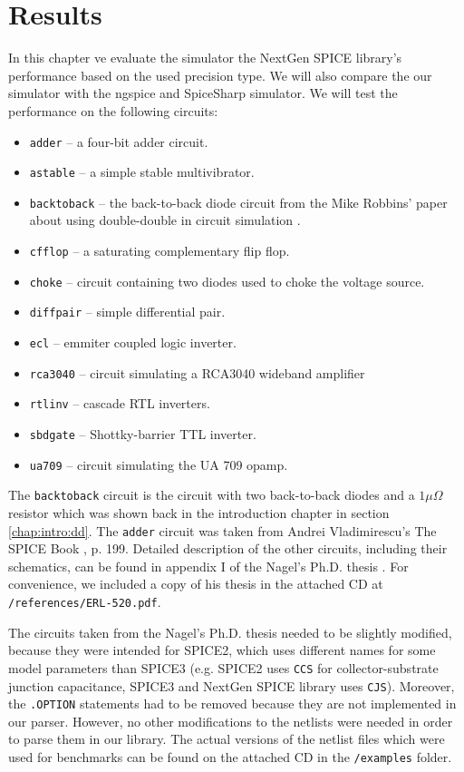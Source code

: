 \chapter{Results}

In this chapter ve evaluate the simulator the NextGen SPICE library's performance based on the used precision type. We will also compare the our simulator with the ngspice  and SpiceSharp simulator. We will test the performance on the following circuits:

\begin{itemize}
	 \item \texttt{adder} -- a four-bit adder circuit.
	 \item \texttt{astable} -- a simple stable multivibrator.
	 \item \texttt{backtoback} -- the back-to-back diode circuit from the Mike Robbins' paper about using double-double in circuit simulation \cite{circuitlab_dd}.
	 \item \texttt{cfflop} -- a saturating complementary flip flop.
	 \item \texttt{choke} -- circuit containing two diodes used to choke the voltage source.
	 \item \texttt{diffpair} -- simple differential pair.
	 \item \texttt{ecl} -- emmiter coupled logic inverter.
	 \item \texttt{rca3040} -- circuit simulating a RCA3040 wideband amplifier
	 \item \texttt{rtlinv} -- cascade RTL inverters.
	 \item \texttt{sbdgate} -- Shottky-barrier TTL inverter.
	 \item \texttt{ua709} -- circuit simulating the UA 709 opamp.
\end{itemize}

The \texttt{backtoback} circuit is the circuit with two back-to-back diodes and a $1 \mu\Omega$ resistor which was shown back in the introduction chapter in section \ref{chap:intro:dd}. The \texttt{adder} circuit was taken from Andrei Vladimirescu's The SPICE Book \cite{spice_book}, p. 199. Detailed description of the other circuits, including their schematics, can be found in appendix I of the Nagel's Ph.D. thesis \cite{Nagel:M520}. For convenience, we included a copy of his thesis in the attached CD at \texttt{/references/ERL-520.pdf}.

The circuits taken from the Nagel's Ph.D. thesis needed to be slightly modified, because they were intended for SPICE2, which uses different names for some model parameters than SPICE3 (e.g. SPICE2 uses \texttt{CCS} for collector-substrate junction capacitance, SPICE3 and NextGen SPICE library uses \texttt{CJS}). Moreover, the \texttt{.OPTION} statements had to be removed because they are not implemented in our parser. However, no other modifications to the netlists were needed in order to parse them in our library. The actual versions of the netlist files which were used for benchmarks can be found on the attached CD in the \texttt{/examples} folder. 

